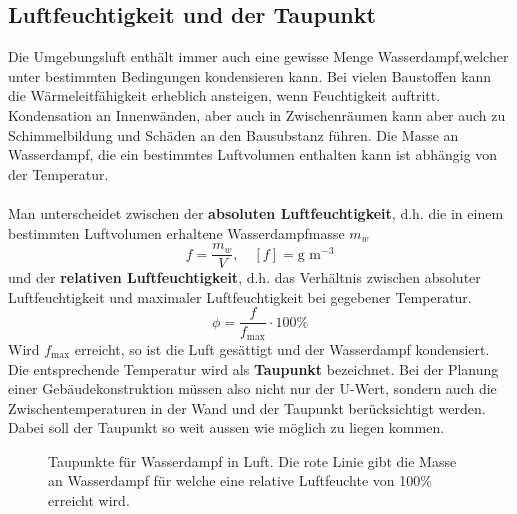 \subsection{Luftfeuchtigkeit und der Taupunkt}
Die Umgebungsluft enthält immer auch eine gewisse Menge Wasserdampf,welcher unter bestimmten Bedingungen kondensieren kann. Bei vielen Baustoffen kann die Wärmeleitfähigkeit erheblich ansteigen, wenn Feuchtigkeit auftritt. Kondensation an Innenwänden, aber auch in Zwischenräumen kann aber auch zu Schimmelbildung und Schäden an den Bausubstanz führen. Die Masse an Wasserdampf, die ein bestimmtes Luftvolumen enthalten kann ist abhängig von der Temperatur. 
\\\\
Man unterscheidet zwischen der \textbf{absoluten Luftfeuchtigkeit}, d.h. die in einem bestimmten Luftvolumen erhaltene Wasserdampfmasse $m_w$ 
\begin{equation}
\boxed{f=\dfrac{m_w}{V},\quad [f]=\text{g m}^{-3}}
\end{equation}
und der \textbf{relativen Luftfeuchtigkeit}, d.h. das Verhältnis zwischen absoluter Luftfeuchtigkeit und maximaler Luftfeuchtigkeit bei gegebener Temperatur.
\begin{equation}
\boxed{\phi=\dfrac{f}{f_{\text{max}}}\cdot 100\%}
\end{equation}
Wird $f_{\text{max}}$ erreicht, so ist die Luft gesättigt und der Wasserdampf kondensiert. Die entsprechende Temperatur wird als \textbf{Taupunkt} bezeichnet.
\newline\newline
Bei der Planung einer Gebäudekonstruktion müssen also nicht nur der U-Wert, sondern auch die Zwischentemperaturen in der Wand und der Taupunkt berücksichtigt werden. Dabei soll der Taupunkt so weit aussen wie möglich zu liegen kommen.
\begin{figure}[H]
\centering
\caption{Taupunkte für Wasserdampf in Luft. Die rote Linie gibt die Masse an Wasserdampf für welche eine relative Luftfeuchte von 100\% erreicht wird.}
\label{fig_Iq}
\end{figure}
